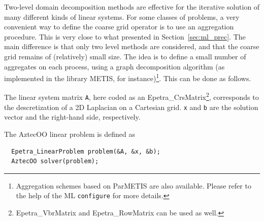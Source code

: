 Two-level domain decomposition methods are
effective for the iterative solution of many different kinds of linear
systems.  For some classes of problems, a very convenient way to define
the coarse grid operator is to use an aggregation procedure. This is very
close to what presented in Section~\ref{sec:ml_prec}. The main
difference is that only two level methods are considered, and that the
coarse grid remains of (relatively) small size. The idea is to define a
small number of aggregates on each process, using a graph decomposition
algorithm (as implemented in the library METIS, for
instance)\footnote{Aggregation schemes based on ParMETIS are also
available. Please refer to the help of the ML {\tt configure} for more
details.}. This can be done as follows.

The linear system matrix \verb!A!, here coded as an
Epetra\_CrsMatrix\footnote{Epetra\_VbrMatrix and Epetra\_RowMatrix can
  be used as well.}, corresponds to the descretization of a 2D Laplacian
on a Cartesian grid. \verb!x! and \verb!b! are the solution vector and
the right-hand side, respectively.

The AztecOO linear problem is defined as
\begin{verbatim}
  Epetra_LinearProblem problem(&A, &x, &b);
  AztecOO solver(problem);
\end{verbatim}

